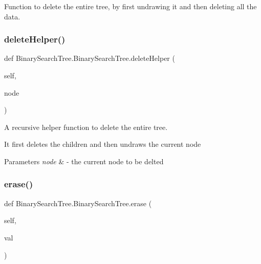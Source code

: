 Function to delete the entire tree, by first undrawing it and then deleting all the data. 

\mbox{\label{class_binary_search_tree_1_1_binary_search_tree_a443c7f4b6e51d0bd1e73e57764598c25}} 
\subsubsection{\texorpdfstring{delete\+Helper()}{deleteHelper()}}
{\footnotesize\ttfamily def Binary\+Search\+Tree.\+Binary\+Search\+Tree.\+delete\+Helper (\begin{DoxyParamCaption}\item[{}]{self,  }\item[{}]{node }\end{DoxyParamCaption})}



A recursive helper function to delete the entire tree. 

It first deletes the children and then undraws the current node


\begin{DoxyParams}{Parameters}
{\em node} & -\/ the current node to be delted \\
\hline
\end{DoxyParams}
\mbox{\label{class_binary_search_tree_1_1_binary_search_tree_ada4129c8eb622c9180596f7df720f4db}} 
\subsubsection{\texorpdfstring{erase()}{erase()}}
{\footnotesize\ttfamily def Binary\+Search\+Tree.\+Binary\+Search\+Tree.\+erase (\begin{DoxyParamCaption}\item[{}]{self,  }\item[{}]{val }\end{DoxyParamCaption})}




